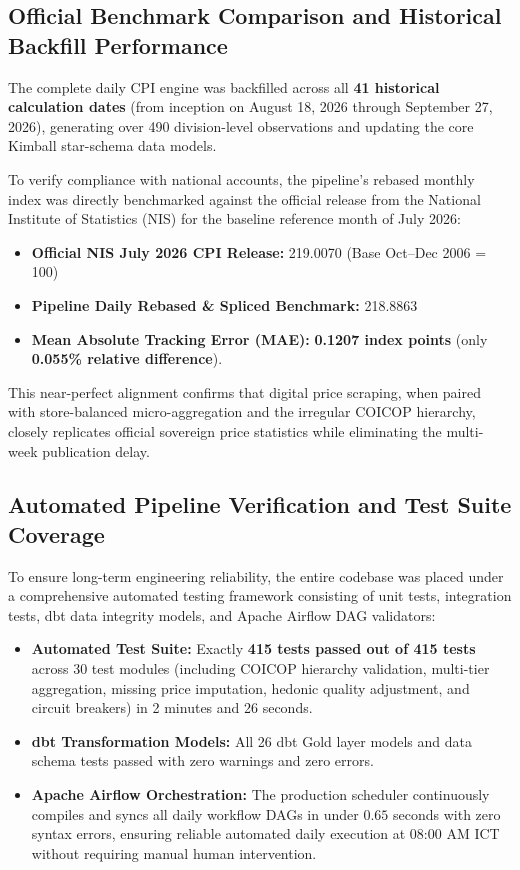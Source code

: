 \subsection{Official Benchmark Comparison and Historical Backfill Performance}
\hs The complete daily CPI engine was backfilled across all \textbf{41 historical calculation dates} (from inception on August 18, 2026 through September 27, 2026), generating over 490 division-level observations and updating the core Kimball star-schema data models.

\hs To verify compliance with national accounts, the pipeline's rebased monthly index was directly benchmarked against the official release from the National Institute of Statistics (NIS) for the baseline reference month of July 2026:
\begin{itemize}
    \item \textbf{Official NIS July 2026 CPI Release:} 219.0070 (Base Oct--Dec 2006 = 100)
    \item \textbf{Pipeline Daily Rebased \& Spliced Benchmark:} 218.8863
    \item \textbf{Mean Absolute Tracking Error (MAE):} \textbf{0.1207 index points} (only \textbf{0.055\% relative difference}).
\end{itemize}
This near-perfect alignment confirms that digital price scraping, when paired with store-balanced micro-aggregation and the irregular COICOP hierarchy, closely replicates official sovereign price statistics while eliminating the multi-week publication delay.

\subsection{Automated Pipeline Verification and Test Suite Coverage}
\hs To ensure long-term engineering reliability, the entire codebase was placed under a comprehensive automated testing framework consisting of unit tests, integration tests, dbt data integrity models, and Apache Airflow DAG validators:
\begin{itemize}
    \item \textbf{Automated Test Suite:} Exactly \textbf{415 tests passed out of 415 tests} across 30 test modules (including COICOP hierarchy validation, multi-tier aggregation, missing price imputation, hedonic quality adjustment, and circuit breakers) in 2 minutes and 26 seconds.
    \item \textbf{dbt Transformation Models:} All 26 dbt Gold layer models and data schema tests passed with zero warnings and zero errors.
    \item \textbf{Apache Airflow Orchestration:} The production scheduler continuously compiles and syncs all daily workflow DAGs in under $0.65$ seconds with zero syntax errors, ensuring reliable automated daily execution at 08:00 AM ICT without requiring manual human intervention.
\end{itemize}


